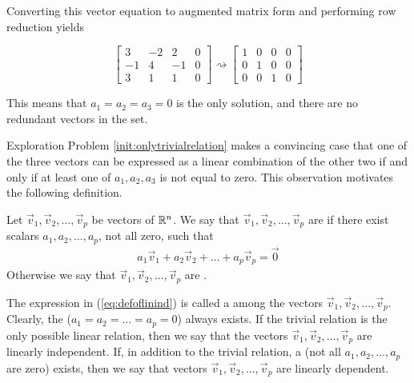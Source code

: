 \documentclass{ximera}
\begin{document}
\begin{initprob}
Converting this vector equation to augmented matrix form and performing row reduction yields

$$\left[\begin{array}{ccc|c}  
 3&-2&2&0\\-1&4&-1&0\\3&1&1&0
 \end{array}\right]\rightsquigarrow\left[\begin{array}{ccc|c}  
 1&0&0&0\\0&1&0&0\\0&0&1&0
 \end{array}\right]$$
 
This means that $a_1=a_2=a_3=0$ is the only solution, and there are no redundant vectors in the set.
\end{initprob}

Exploration Problem \ref{init:onlytrivialrelation} makes a convincing case that one of the three vectors can be expressed as a linear combination of the other two if and only if at least one of $a_1, a_2, a_3$ is not equal to zero.  This observation motivates the following definition.

\begin{definition}\label{def:linearindependence}
Let $\vec{v}_1, \vec{v}_2,\ldots ,\vec{v}_p$ be vectors of $\mathbb{R}^n$.  We say that $\vec{v}_1, \vec{v}_2,\ldots ,\vec{v}_p$ are  if there exist scalars $a_1, a_2, \ldots , a_p$, not all zero, such that
\begin{align}\label{eq:defoflinind}a_1\vec{v}_1+a_2\vec{v}_2+\ldots +a_p\vec{v}_p=\vec{0}\end{align}
Otherwise we say that $\vec{v}_1, \vec{v}_2,\ldots ,\vec{v}_p$ are .
\end{definition}

The expression in    (\ref{eq:defoflinind}) is called a  among the vectors $\vec{v}_1, \vec{v}_2,\ldots ,\vec{v}_p$.   Clearly, the  ($a_1=a_2=\ldots =a_p=0$) always exists.  If the trivial relation is the only possible linear relation, then we say that the vectors $\vec{v}_1, \vec{v}_2,\ldots ,\vec{v}_p$ are linearly independent.  If, in addition to the trivial relation, a  (not all $a_1, a_2,\ldots ,a_p$ are zero) exists, then we say that vectors $\vec{v}_1, \vec{v}_2,\ldots ,\vec{v}_p$ are linearly dependent.
\end{document}
